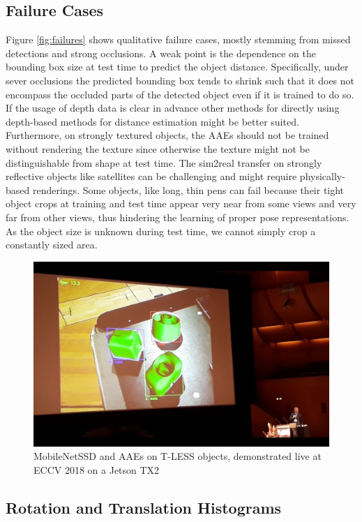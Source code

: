 {{	\subsection{Failure Cases}
	Figure \ref{fig:failures} shows qualitative failure cases, mostly stemming from missed detections and strong occlusions. A weak point is the dependence on the bounding box size at test time to predict the object distance. Specifically, under sever occlusions the predicted bounding box tends to shrink such that it does not encompass the occluded parts of the detected object even if it is trained to do so.
	If the usage of depth data is clear in advance other methods for directly using depth-based methods for distance estimation might be better suited. Furthermore, on strongly textured objects, the AAEs should not be trained without rendering the texture since otherwise the texture might not be distinguishable from shape at test time. The sim2real transfer on strongly reflective objects like satellites can be challenging and might require physically-based renderings.
	Some objects, like long, thin pens can fail because their tight object crops at training and test time appear very near from some views and very far from other views, thus hindering the learning of proper pose representations. As the object size is unknown during test time, we cannot simply crop a constantly sized area. 
	

\begin{figure}[t]%
	\centering
	\captionsetup{width=0.99\columnwidth}
	\includegraphics[width=0.9\columnwidth]{ECCV-live-demo.png}
	\caption{MobileNetSSD and \glspl{AAE} on T-LESS objects, demonstrated live at ECCV 2018 on a Jetson TX2}
	\label{fig:ECCV-live-demo}
\end{figure}

	\subsection{Rotation and Translation Histograms}
	
}}
